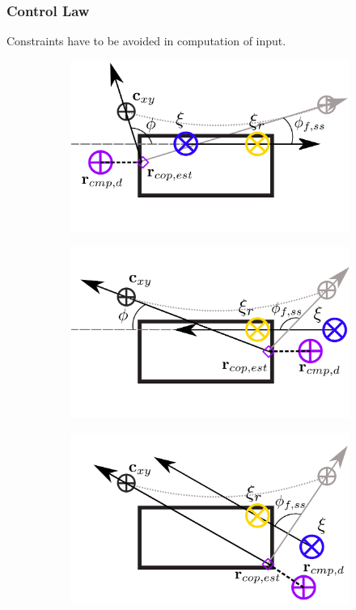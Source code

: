 \subsubsection{Control Law}
Constraints have to be avoided in computation of input.\\


\begin{figure}[h]
  \begin{subfigure}{0.5\textwidth}
  \centering
  \includegraphics[width=.8\linewidth]{STYLESTUFF/ICPplanStartSSPhiViz.png}
   \caption{}
    \label{fig:phiViza}
  \end{subfigure}
  \begin{subfigure}{0.5\textwidth}
    \centering
  \includegraphics[width=.8\linewidth]{STYLESTUFF/ICPplanStartSSPhiVizNegError.png}
  \caption{}
   \label{fig:phiVizb}
  \end{subfigure}
  \begin{subfigure}{0.5\textwidth}
    \centering
  \includegraphics[width=.8\linewidth]{STYLESTUFF/ICPplanStartSSPhiViz0.png}

\end{subfigure}
\end{figure}
